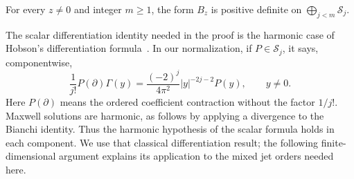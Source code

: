\begin{proposition}\label{ch03:jet-positive}
For every $z\ne0$ and integer $m\ge1$, the form $B_z$ is positive
definite on $\bigoplus_{j<m}\mathcal S_j$.
\end{proposition}

The scalar differentiation identity needed in the proof is the harmonic
case of Hobson's differentiation formula~\cite{Hobson1892}. In our
normalization, if $P\in\mathcal S_j$, it says, componentwise,
\begin{equation}\label{ch03:hobson}
 \frac1{j!}P(\partial)\Gamma(y)
   =\frac{(-2)^j}{4\pi^2}|y|^{-2j-2}P(y),\qquad y\ne0.
\end{equation}
Here $P(\partial)$ means the ordered coefficient contraction without
the factor $1/j!$. Maxwell solutions are harmonic, as follows by
applying a divergence to the Bianchi identity. Thus the harmonic
hypothesis of the scalar formula holds in each component. We use that
classical differentiation result; the following finite-dimensional
argument explains its application to the mixed jet orders needed here.

